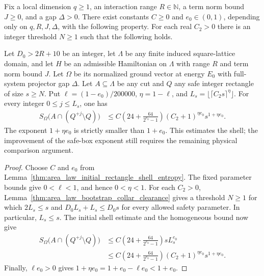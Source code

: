 \begin{lemma}
    \label{thm:area_law_initial_rounded_collar_entropy}
    \leanok
    Fix a local dimension $q\ge1$, an interaction range $R\in\mathbb N$,
    a term norm bound $J\ge0$, and a gap $\Delta>0$.
    There exist constants $C\ge0$ and $e_0\in(0,1)$, depending only on
    $q,R,J,\Delta$, with the following property. For each real $C_2>0$
    there is an integer threshold $N\ge1$ such that the following holds.

    Let $D_0>2R+10$ be an integer, let $\Lambda$ be any finite induced
    square-lattice domain, and let $H$ be an admissible Hamiltonian on
    $\Lambda$ with range $R$ and term norm bound $J$. Let $\Omega$ be
    its normalized ground vector at energy $E_0$ with full-system
    projector gap $\Delta$. Let $A\subseteq\Lambda$ be any cut and
    $Q$ any safe integer rectangle of size $s\ge N$.
    Put $\ell=(1-e_0)/200000$, $\eta=1-\ell$, and
    $L_s=\lfloor\lceil C_2s\rceil^\eta\rfloor$. For every integer
    $0\le j\le L_s$, one has
    \begin{align}
        S_\Omega\bigl(A\cap(Q^{+j}\setminus Q)\bigr)
         & \le C\left(24+\frac{64}{2^{e_0}-1}\right)
        (C_2+1)^{\eta e_0}s^{1+\eta e_0}.
    \end{align}
    The exponent $1+\eta e_0$ is strictly smaller than $1+e_0$.
    This estimates the shell; the improvement of the safe-box exponent
    still requires the remaining physical comparison argument.
\end{lemma}
\begin{proof}
    \leanok
    Choose $C$ and $e_0$ from
    Lemma~\ref{thm:area_law_initial_rectangle_shell_entropy}.
    The fixed parameter bounds give $0<\ell<1$, and hence $0<\eta<1$.
    For each $C_2>0$, Lemma~\ref{thm:area_law_bootstrap_collar_clearance}
    gives a threshold $N\ge1$ for which $2L_s\le s$ and
    $D_0L_s+L_s\le D_0s$ for every allowed safety parameter.
    In particular, $L_s\le s$. The initial shell estimate and the homogeneous
    bound now give
    \begin{align}
        S_\Omega\bigl(A\cap(Q^{+j}\setminus Q)\bigr)
         & \le C\left(24+\frac{64}{2^{e_0}-1}\right)sL_s^{e_0} \\
         & \le C\left(24+\frac{64}{2^{e_0}-1}\right)
        (C_2+1)^{\eta e_0}s^{1+\eta e_0}.
    \end{align}
    Finally, $\ell e_0>0$ gives
    $1+\eta e_0=1+e_0-\ell e_0<1+e_0$.
\end{proof}
